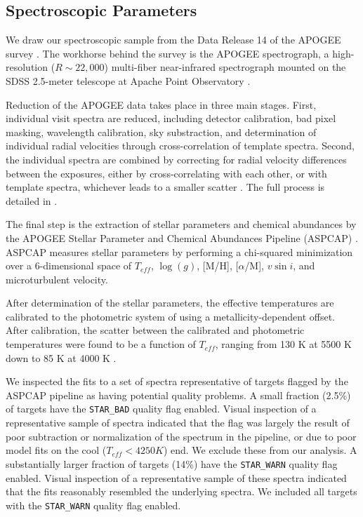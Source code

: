 \documentclass[manuscript]{aastex6}
\newcommand{\vsini}{\ensuremath{v \sin i}}
\newcommand{\Teff}{\ensuremath{T_{eff}}}
\newcommand{\logg}{\ensuremath{\log(g)}}
\newcommand{\STARBAD}{\texttt{STAR\_BAD}}
\newcommand{\STARWARN}{\texttt{STAR\_WARN}}
\begin{document}
\subsection{Spectroscopic Parameters}

We draw our spectroscopic sample from the Data Release 14 \citep{Abolfathi18}
of the APOGEE survey \citep{Majewski17}. The workhorse behind the survey is the
APOGEE spectrograph, a high-resolution (\(R \sim 22,000\)) multi-fiber
near-infrared spectrograph \citep{Wilson10} mounted on the SDSS 2.5-meter
telescope at Apache Point Observatory \citep{Gunn06}.

Reduction of the APOGEE data takes place in three main stages. First,
individual visit spectra are reduced, including detector calibration, bad pixel
masking, wavelength calibration, sky substraction, and determination of
individual radial velocities through cross-correlation of template spectra.
Second, the individual spectra are combined by correcting for radial velocity
differences between the exposures, either by cross-correlating with each other,
or with template spectra, whichever leads to a smaller scatter
\citep{Holtzman18}. The full process is detailed in \citet{Nidever15}.

The final step is the extraction of stellar parameters and chemical abundances
by the APOGEE Stellar Parameter and Chemical Abundances Pipeline (ASPCAP)
\citep{GarciaPerez16}. ASPCAP measures stellar parameters by performing a
chi-squared minimization \citep{AllendePrieto06} over a 6-dimensional space of
\Teff, \logg, [M/H], [\(\alpha\)/M], \vsini, and microturbulent velocity.

After determination of the stellar parameters, the effective temperatures are 
calibrated to the photometric system of \citet{GonzalezHernandez09} using a 
metallicity-dependent offset. After calibration, the scatter between the 
calibrated and photometric temperatures  were found to be a function of 
\Teff{}, ranging from 130 K at 5500 K down to 85 K at 4000 K
\citep{Holtzman18}.

We inspected the fits to a set of spectra representative of targets flagged 
by the ASPCAP pipeline as having potential quality problems. A small fraction
(2.5\%) of targets have the \STARBAD{} quality flag enabled. Visual inspection
of a representative sample of spectra indicated that the flag was largely the
result of poor subtraction or normalization of the spectrum in the pipeline, or
due to poor model fits on the cool (\(\Teff < 4250 K\)) end. We exclude these
from our analysis. A substantially larger fraction of targets (14\%) have the 
\STARWARN{} quality flag enabled. Visual inspection of a representative sample 
of these spectra indicated that the fits reasonably resembled the underlying 
spectra. We included all targets with the \STARWARN{} quality flag enabled.
\end{document}
